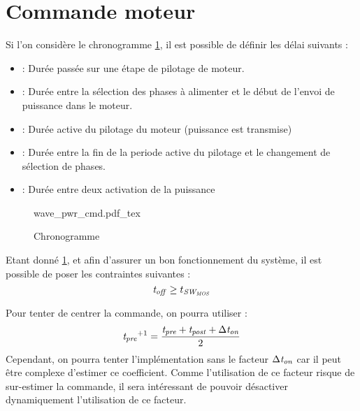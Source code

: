 \section{Commande moteur}
Si l'on considère le chronogramme \cref{fig:chrono_centered_motor}, il est possible de définir les délai suivants :
\begin{itemize}
    \item \tstep : Durée passée sur une étape de pilotage de moteur.
    \item \tpre : Durée entre la sélection des phases à alimenter et le début de l'envoi de puissance dans le moteur.
    \item \ton  : Durée active du pilotage du moteur (puissance est transmise)
    \item \tpost: Durée entre la fin de la periode active du pilotage et le changement de sélection de phases.
    \item \toff : Durée entre deux activation de la puissance
\end{itemize}

\begin{figure}[h]
    \def\svgwidth{17cm}
    {wave_pwr_cmd.pdf_tex}
    \caption{Chronogramme}
    \label{fig:chrono_centered_motor}
\end{figure}

Etant donné \cref{fig:chrono_centered_motor}, et afin d'assurer un bon fonctionnement du système, il est possible de poser les contraintes suivantes :
$$\mathit{t_{off}} \ge t_{\mathit{SW_{\mathit{MOS}}}}$$

Pour tenter de centrer la commande, on pourra utiliser :
$$\mathit{t_{pre}}^{+1} = \frac{\mathit{t_{pre}} + \mathit{t_{post}} + \Delta \mathit{t_{on}}}{2}$$
Cependant, on pourra tenter l'implémentation sans le facteur $\Delta\mathit{t_{on}}$ car il peut être complexe d'estimer ce coefficient.
Comme l'utilisation de ce facteur risque de sur-estimer la commande, il sera intéressant de pouvoir désactiver dynamiquement l'utilisation de ce facteur.

